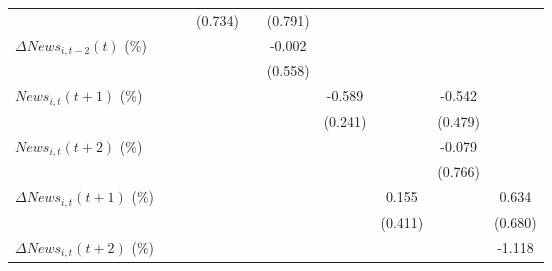 {\begin{tabular}{l*{9}{c}}
                    &                     &                     &     (0.734)         &                     &     (0.791)         &                     &                     &                     &                     \\
\addlinespace
$ \Delta News_{i,t-2}(t)$ (\%)&                     &                     &                     &                     &      -0.002         &                     &                     &                     &                     \\
                    &                     &                     &                     &                     &     (0.558)         &                     &                     &                     &                     \\
\addlinespace
$ News_{i,t}(t+1)$ (\%)&                     &                     &                     &                     &                     &      -0.589\sym{**} &                     &      -0.542         &                     \\
                    &                     &                     &                     &                     &                     &     (0.241)         &                     &     (0.479)         &                     \\
\addlinespace
$ News_{i,t}(t+2)$ (\%)&                     &                     &                     &                     &                     &                     &                     &      -0.079         &                     \\
                    &                     &                     &                     &                     &                     &                     &                     &     (0.766)         &                     \\
\addlinespace
$ \Delta News_{i,t}(t+1)$ (\%)&                     &                     &                     &                     &                     &                     &       0.155         &                     &       0.634         \\
                    &                     &                     &                     &                     &                     &                     &     (0.411)         &                     &     (0.680)         \\
\addlinespace
$ \Delta News_{i,t}(t+2)$ (\%)&                     &                     &                     &                     &                     &                     &                     &                     &      -1.118         \\

\end{tabular}}
